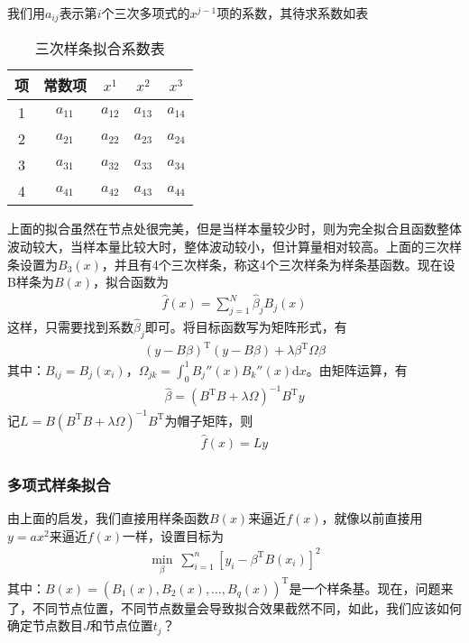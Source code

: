             我们用$a_{ij}$表示第$i$个三次多项式的$x^{j-1}$项的系数，其待求系数如表
            \begin{table}[htbp]
              \caption{三次样条拟合系数表}
              \label{tab:三次样条拟合系数表}
              \centering
              \begin{tabular}{c|cccc}
              \toprule
              项     & 常数项 & $x^1$  & $x^2$  & $x^3$ \\
              \midrule
              1      & $a_{11}$      & $a_{12}$      & $a_{13}$     &$a_{14}$ \\
              2      & $a_{21}$      & $a_{22}$      & $a_{23}$     &$a_{24}$ \\
              3      & $a_{31}$      & $a_{32}$      & $a_{33}$     &$a_{34}$ \\
              4      & $a_{41}$      & $a_{42}$      & $a_{43}$     &$a_{44}$ \\
              \bottomrule
              \end{tabular}
            \end{table}
            \par
            上面的拟合虽然在节点处很完美，但是当样本量较少时，则为完全拟合且函数整体波动较大，当样本量比较大时，整体波动较小，但计算量相对较高。上面的三次样条设置为$B_3(x)$，并且有4个三次样条，称这4个三次样条为样条基函数。现在设B样条为$B(x)$，拟合函数为
            \begin{align*}
            \hat{f}(x) = \sum_{j=1}^N\hat{\beta}_jB_j(x)
            \end{align*}
            这样，只需要找到系数$\hat{\beta}_j$即可。将目标函数写为矩阵形式，有
            \begin{align*}
            (y-B\beta)^\mathrm{T}(y-B\beta) + \lambda \beta^\mathrm{T}\Omega\beta
            \end{align*}
            其中：$B_{ij} = B_j(x_i)$，$\Omega_{jk} = \int_0^1 B_j''(x)B_k''(x)\mathrm{d}x$。由矩阵运算，有
            \begin{align*}
            \hat{\beta} = (B^\mathrm{T}B+\lambda \Omega)^{-1}B^\mathrm{T}y
            \end{align*}
            记$L = B(B^\mathrm{T}B+\lambda \Omega)^{-1}B^\mathrm{T}$为帽子矩阵，则
            \begin{align*}
            \hat{f}(x) = Ly
            \end{align*}

        \subsubsection{多项式样条拟合}
            \par
            由上面的启发，我们直接用样条函数$B(x)$来逼近$f(x)$，就像以前直接用$y = ax^2$来逼近$f(x)$一样，设置目标为
            \begin{align*}
            \min_\beta\ \sum_{i=1}^n[y_i - \beta^\mathrm{T}B(x_i)]^2
            \end{align*}
            其中：$B(x) = (B_1(x),B_2(x),\dots,B_q(x))^\mathrm{T}$是一个样条基。现在，问题来了，不同节点位置，不同节点数量会导致拟合效果截然不同，如此，我们应该如何确定节点数目$J$和节点位置$t_j$？
